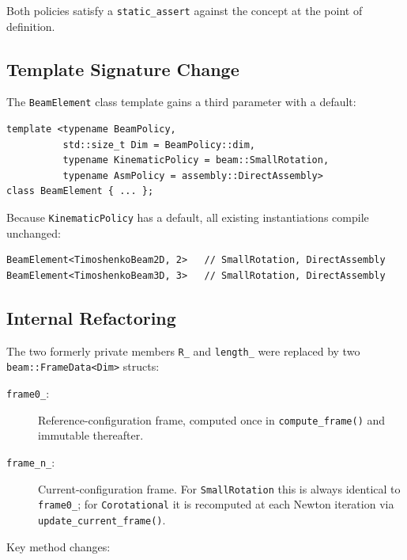 Both policies satisfy a \texttt{static\_assert} against the concept
at the point of definition.

\subsection{Template Signature Change}

The \texttt{BeamElement} class template gains a third parameter with
a default:

\begin{verbatim}
template <typename BeamPolicy,
          std::size_t Dim = BeamPolicy::dim,
          typename KinematicPolicy = beam::SmallRotation,
          typename AsmPolicy = assembly::DirectAssembly>
class BeamElement { ... };
\end{verbatim}

\noindent
Because \texttt{KinematicPolicy} has a default, all existing
instantiations compile unchanged:

\begin{verbatim}
BeamElement<TimoshenkoBeam2D, 2>   // SmallRotation, DirectAssembly
BeamElement<TimoshenkoBeam3D, 3>   // SmallRotation, DirectAssembly
\end{verbatim}

\subsection{Internal Refactoring}

The two formerly private members \texttt{R\_} and \texttt{length\_}
were replaced by two \texttt{beam::FrameData<Dim>} structs:

\begin{description}
  \item[\texttt{frame0\_}:] Reference-configuration frame, computed
    once in \texttt{compute\_frame()} and immutable thereafter.
  \item[\texttt{frame\_n\_}:] Current-configuration frame.  For
    \texttt{SmallRotation} this is always identical to
    \texttt{frame0\_}; for \texttt{Corotational} it is recomputed
    at each Newton iteration via \texttt{update\_current\_frame()}.
\end{description}

\noindent
Key method changes:

